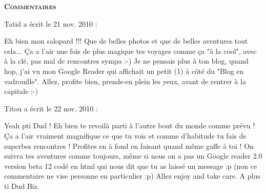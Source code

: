 \bigskip
\textbf{\textsc{Commentaires}}

\medskip
Tatid a écrit le 21 nov. 2010 :
\begin{displayquote}
Eh bien mon salopard !!! Que de belles photos et que de belles aventures tout cela... Ça a l'air une fois de plus magique tes voyages comme ça "à la cool", avec à la clé, pas mal de rencontres sympa :-)
Je ne pensais plus à ton blog, quand hop, j'ai vu mon Google Reader qui affichait un petit (1) à côté du "Blog en vadrouille".
Allez, profite bien, prends-en plein les yeux, avant de rentrer à la capitale ;-)
\end{displayquote}

\medskip
Titou a écrit le 22 nov. 2010 :
\begin{displayquote}
Yeah pti Dud !
Eh bien te revoilà parti à l'autre bout du monde comme prévu ! Ça a l'air vraiment magnifique ce que tu vois et comme d'habitude tu fais de superbes rencontres ! Profites en à fond en faisant quand même gaffe à toi ! On suivra tes aventures comme toujours, même si nous on a pas un Google reader 2.0 version beta 12 codé en html qui nous dit que tu as laissé un message :p
(non ce commentaire ne vise personne en particulier :p)
Allez enjoy and take care.
A plus ti Dud
Biz.
\end{displayquote}

\vfill
